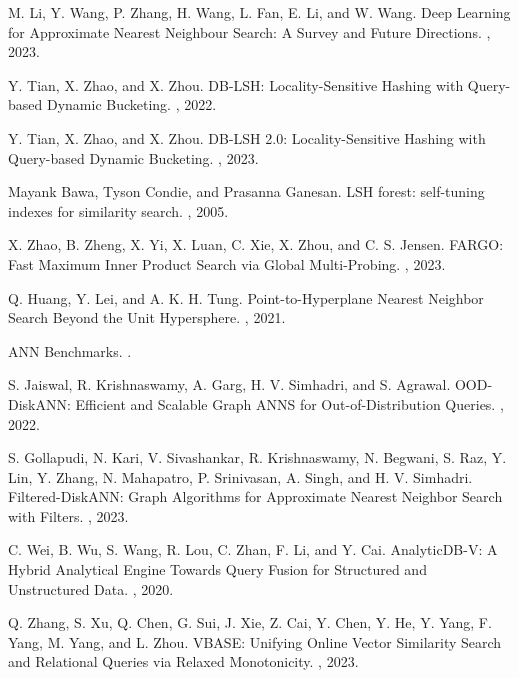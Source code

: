 \documentclass[11pt]{article}
\begin{document}
\begin{thebibliography}{10}
\begin{small}
M. Li, Y. Wang, P. Zhang, H. Wang, L. Fan, E. Li, and W. Wang.
\newblock Deep Learning for Approximate Nearest Neighbour Search: A Survey and Future Directions.
, 2023.

Y. Tian, X. Zhao, and X. Zhou.
\newblock DB-LSH: Locality-Sensitive Hashing with Query-based Dynamic Bucketing.
, 2022.

Y. Tian, X. Zhao, and X. Zhou.
\newblock DB-LSH 2.0: Locality-Sensitive Hashing with Query-based Dynamic Bucketing.
, 2023.

Mayank Bawa, Tyson Condie, and Prasanna Ganesan.
\newblock LSH forest: self-tuning indexes for similarity search.
, 2005.


X. Zhao, B. Zheng, X. Yi, X. Luan, C. Xie, X. Zhou, and C. S. Jensen.
\newblock FARGO: Fast Maximum Inner Product Search via Global Multi-Probing.
, 2023.


Q. Huang, Y. Lei, and A. K. H. Tung.
\newblock Point-to-Hyperplane Nearest Neighbor Search Beyond the Unit Hypersphere.
, 2021.



\newblock ANN Benchmarks.
.


S. Jaiswal, R. Krishnaswamy, A. Garg, H. V. Simhadri, and S. Agrawal.
\newblock OOD-DiskANN: Efficient and Scalable Graph {ANNS} for Out-of-Distribution Queries.
, 2022.

S. Gollapudi, N. Kari, V. Sivashankar, R. Krishnaswamy, N. Begwani, S. Raz, Y. Lin, Y. Zhang, N. Mahapatro, P. Srinivasan, A. Singh, and H. V. Simhadri.
\newblock Filtered-DiskANN: Graph Algorithms for Approximate Nearest Neighbor Search with Filters.
, 2023.


C. Wei, B. Wu, S. Wang, R. Lou, C. Zhan, F. Li, and Y. Cai.
\newblock AnalyticDB-V: A Hybrid Analytical Engine Towards Query Fusion for Structured and Unstructured Data.
, 2020.


Q. Zhang, S. Xu, Q. Chen, G. Sui, J. Xie, Z. Cai, Y. Chen, Y. He, Y. Yang, F. Yang, M. Yang, and  L. Zhou.
\newblock VBASE: Unifying Online Vector Similarity Search and Relational Queries via Relaxed Monotonicity.
, 2023.









\end{small}
\end{thebibliography}
\end{document}
